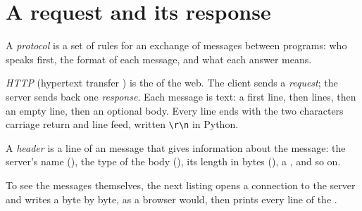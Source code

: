 \section{A request and its response}\label{sec:g10:http-clients-servers:http}

\begin{definition}[Protocol]\label{def:g10:http-clients-servers:protocol}
A \emph{protocol} is a set of rules for an exchange of messages between programs: who speaks first,
the format of each message, and what each answer means.
\end{definition}

\begin{definition}\label{def:g10:http-clients-servers:http}
\emph{HTTP} (hypertext transfer ) is the  of the web. The client sends a
\emph{request}; the server sends back one \emph{response}. Each message is text: a
first line, then  lines, then an empty line, then an optional body. Every line ends with the two characters
carriage return and line feed, written \texttt{\textbackslash r\textbackslash n} in Python.
\end{definition}

\begin{definition}[Header]\label{def:g10:http-clients-servers:http-header}
A \emph{header} is a line  of an  message that gives information about
the message: the server's name (), the type of the body (), its length in bytes
(), a , and so on.
\end{definition}

To see the messages themselves, the next listing opens a connection to the server and writes a  byte by byte,
as a browser would, then prints every line of the .

\label{lst:g10:http-clients-servers:raw-exchange}

